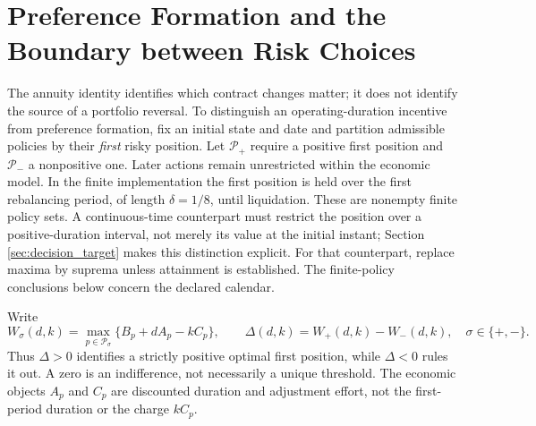 \section{Preference Formation and the Boundary between Risk Choices}
\label{sec:risk_frontier}
The annuity identity identifies which contract changes matter; it does not identify the source of a portfolio reversal. To distinguish an operating-duration incentive from preference formation, fix an initial state and date and partition admissible policies by their \emph{first} risky position. Let $\mathcal P_+$ require a positive first position and $\mathcal P_-$ a nonpositive one. Later actions remain unrestricted within the economic model. In the finite implementation the first position is held over the first rebalancing period, of length $\delta=1/8$, until liquidation. These are nonempty finite policy sets. A continuous-time counterpart must restrict the position over a positive-duration interval, not merely its value at the initial instant; Section \ref{sec:decision_target} makes this distinction explicit. For that counterpart, replace maxima by suprema unless attainment is established. The finite-policy conclusions below concern the declared calendar.

Write
\begin{equation}
 W_\sigma(d,k)=\max_{p\in\mathcal P_\sigma}\{B_p+dA_p-kC_p\},\qquad
 \Delta(d,k)=W_+(d,k)-W_-(d,k),\quad \sigma\in\{+,-\}.
 \label{eq:risk_class_values}
\end{equation}
Thus $\Delta>0$ identifies a strictly positive optimal first position, while $\Delta<0$ rules it out. A zero is an indifference, not necessarily a unique threshold. The economic objects $A_p$ and $C_p$ are discounted duration and adjustment effort, not the first-period duration or the charge $kC_p$.

